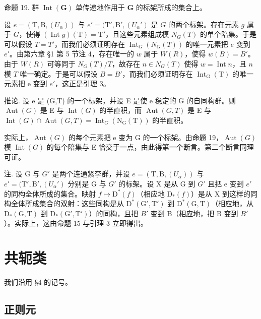 命题 19. 群 \(\operatorname{Int}(\mathbf{G})\) 单传递地作用于 \(\mathbf{G}\) 的标架所成的集合上。

设 \(e = (\mathrm{T}, \mathrm{B}, (U_{\alpha}))\) 与 \(e' = (\mathrm{T}', \mathrm{B}', (U_{\alpha}')\) 是 \(G\) 的两个标架。存在元素 \(g\) 属于 \(G\)，使得 \((\operatorname{Int} g)(\mathrm{T}) = \mathrm{T}'\)，且这些元素组成模 \(N_G(T)\) 的单个陪集。于是可以假设 \(T = T'\)，而我们必须证明存在 \(\operatorname{Int}_G(N_G(T))\) 的唯一元素把 \(e\) 变到 \(e'\)。由第六章 §1 第 5 节注 4，存在唯一的 \(w\) 属于 \(W(R)\)，使得 \(w(B) = B'\)。由于 \(W(R)\) 可等同于 \(N_G(T)/T\)，故存在 \(n \in N_G(T)\) 使得 \(w = \operatorname{Int} n\)，且 \(n\) 模 \(T\) 唯一确定。于是可以假设 \(B = B'\)，而我们必须证明存在 \(\operatorname{Int}_{\mathrm{G}}(\mathrm{T})\) 的唯一元素把 e 变到 \(e'\)，这正是引理 3。

推论. 设 e 是 (G,T) 的一个标架，并设 E 是使 e 稳定的 G 的自同构群。则 \(\operatorname{Aut}(G)\) 是 E 与 \(\operatorname{Int}(G)\) 的半直积，而 \(\operatorname{Aut}(G,T)\) 是 E 与 \(\operatorname{Int}(G)\cap\operatorname{Aut}(G,T)=\operatorname{Int}_{G}(\mathrm{N}_{\mathrm{G}}(\mathrm{T}))\) 的半直积。

实际上，\(\operatorname{Aut}(G)\) 的每个元素把 e 变为 G 的一个标架。由命题 19，\(\operatorname{Aut}(G)\) 模 \(\operatorname{Int}(G)\) 的每个陪集与 E 恰交于一点，由此得第一个断言。第二个断言同理可证。

注. 设 G 与 \(G'\) 是两个连通紧李群，并设 \(e = (\mathrm{T}, \mathrm{B}, (U_{\alpha}))\) 与 \(e' = (\mathrm{T}', \mathrm{B}', (U_{\alpha}')\) 分别是 G 与 \(G'\) 的标架。设 X 是从 G 到 \(G'\) 且把 e 变到 \(e'\) 的同构全体所成的集合。映射 \(f \mapsto \mathrm{D}^{*}(f)\)（相应地 \(\mathrm{D}_{*}(f)\)）是从 X 到这样的同构全体所成集合的双射：这些同构是从 \(\mathrm{D}^{*}(\mathrm{G}', \mathrm{T}')\) 到 \(\mathrm{D}^{*}(\mathrm{G}, \mathrm{T})\)（相应地，从 \(\mathrm{D}_{*}(\mathrm{G}, \mathrm{T})\) 到 \(\mathrm{D}_{*}(\mathrm{G}', \mathrm{T}')\)）的同构，且把 \(B'\) 变到 B（相应地，把 B 变到 \(B'\)）。实际上，这由命题 15 与引理 3 立即得出。

\section{共轭类}

我们沿用 §4 的记号。

\subsection{正则元}

